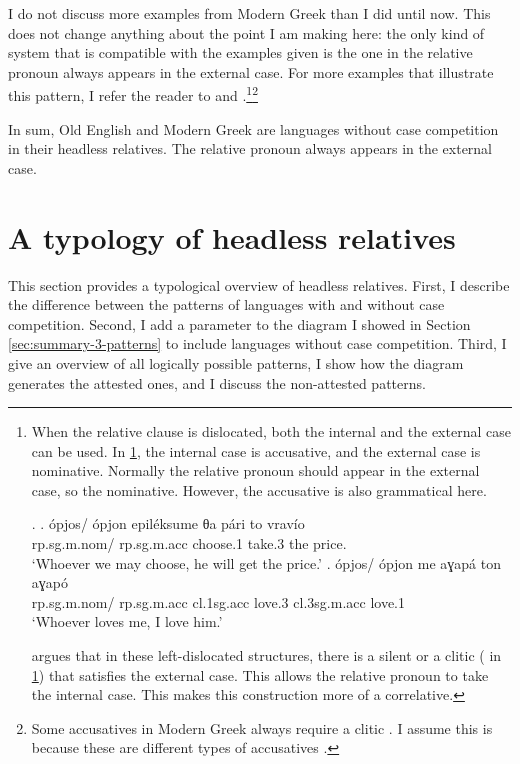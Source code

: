 I do not discuss more examples from Modern Greek than I did until now. This does not change anything about the point I am making here: the only kind of system that is compatible with the examples given is the one in the relative pronoun always appears in the external case. For more examples that illustrate this pattern, I refer the reader to  and .\footnote{
When the relative clause is dislocated, both the internal and the external case can be used. In \ref{ex:greek-dislocated-acc-nom}, the internal case is accusative, and the external case is nominative. Normally the relative pronoun should appear in the external case, so the nominative. However, the accusative is also grammatical here.

\ex.
\ag. ópjos/ ópjon epiléksume θa pári to vravío\\
\ac{rp}.\ac{sg}.\ac{m}.\ac{nom}/ \ac{rp}.\ac{sg}.\ac{m}.\ac{acc} choose.1\scsub{[acc]}  take.3\scsub{[nom]} the price.\\
`Whoever we may choose, he will get the price.'\label{ex:greek-dislocated-acc-nom}
\bg. ópjos/ ópjon me aɣapá ton aɣapó\\
\ac{rp}.\ac{sg}.\ac{m}.\ac{nom}/ \ac{rp}.\ac{sg}.\ac{m}.\ac{acc} \ac{cl}.1\ac{sg}.\ac{acc} love.3\scsub{[nom]}
\ac{cl}.3\ac{sg}.\ac{m}.\ac{acc} love.1\scsub{[acc]}\\
`Whoever loves me, I love him.'\label{ex:greek-dislocated-nom-acc}

\citet{spyropoulos2011} argues that in these left-dislocated structures, there is a silent  or a clitic ( in \ref{ex:greek-dislocated-nom-acc}) that satisfies the external case. This allows the relative pronoun to take the internal case. This makes this construction more of a correlative.
}\footnote{
Some accusatives in Modern Greek always require a clitic \citep[see]{spyropoulos2011}. I assume this is because these are different types of accusatives \citep[see]{starke2017}.
}

In sum, Old English and Modern Greek are languages without case competition in their headless relatives. The relative pronoun always appears in the external case.

\section{A typology of headless relatives}\label{sec:typology}

This section provides a typological overview of headless relatives. First, I describe the difference between the patterns of languages with and without case competition. Second, I add a parameter to the diagram I showed in Section \ref{sec:summary-3-patterns} to include languages without case competition. Third, I give an overview of all logically possible patterns, I show how the diagram generates the attested ones, and I discuss the non-attested patterns.

